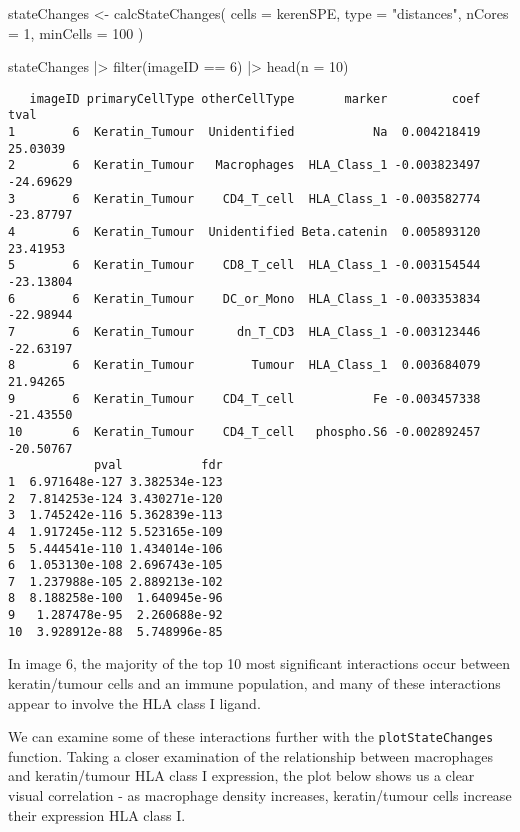 \documentclass[
  letterpaper,
  DIV=11,
  numbers=noendperiod]{scrreprt}
\newenvironment{Shaded}{\begin{snugshade}}{\end{snugshade}}
\newcommand{\AttributeTok}[1]{\textcolor[rgb]{0.40,0.45,0.13}{#1}}
\newcommand{\DecValTok}[1]{\textcolor[rgb]{0.68,0.00,0.00}{#1}}
\newcommand{\FunctionTok}[1]{\textcolor[rgb]{0.28,0.35,0.67}{#1}}
\newcommand{\NormalTok}[1]{\textcolor[rgb]{0.00,0.23,0.31}{#1}}
\newcommand{\OtherTok}[1]{\textcolor[rgb]{0.00,0.23,0.31}{#1}}
\newcommand{\SpecialCharTok}[1]{\textcolor[rgb]{0.37,0.37,0.37}{#1}}
\newcommand{\StringTok}[1]{\textcolor[rgb]{0.13,0.47,0.30}{#1}}
\begin{document}
\begin{Shaded}
\begin{Highlighting}[]
\NormalTok{stateChanges }\OtherTok{\textless{}{-}} \FunctionTok{calcStateChanges}\NormalTok{(}
  \AttributeTok{cells =}\NormalTok{ kerenSPE,}
  \AttributeTok{type =} \StringTok{"distances"}\NormalTok{,}
  \AttributeTok{nCores =} \DecValTok{1}\NormalTok{,}
  \AttributeTok{minCells =} \DecValTok{100}
\NormalTok{)}

\NormalTok{stateChanges }\SpecialCharTok{|\textgreater{}}
  \FunctionTok{filter}\NormalTok{(imageID }\SpecialCharTok{==} \DecValTok{6}\NormalTok{) }\SpecialCharTok{|\textgreater{}}
  \FunctionTok{head}\NormalTok{(}\AttributeTok{n =} \DecValTok{10}\NormalTok{)}
\end{Highlighting}
\end{Shaded}

\begin{verbatim}
   imageID primaryCellType otherCellType       marker         coef      tval
1        6  Keratin_Tumour  Unidentified           Na  0.004218419  25.03039
2        6  Keratin_Tumour   Macrophages  HLA_Class_1 -0.003823497 -24.69629
3        6  Keratin_Tumour    CD4_T_cell  HLA_Class_1 -0.003582774 -23.87797
4        6  Keratin_Tumour  Unidentified Beta.catenin  0.005893120  23.41953
5        6  Keratin_Tumour    CD8_T_cell  HLA_Class_1 -0.003154544 -23.13804
6        6  Keratin_Tumour    DC_or_Mono  HLA_Class_1 -0.003353834 -22.98944
7        6  Keratin_Tumour      dn_T_CD3  HLA_Class_1 -0.003123446 -22.63197
8        6  Keratin_Tumour        Tumour  HLA_Class_1  0.003684079  21.94265
9        6  Keratin_Tumour    CD4_T_cell           Fe -0.003457338 -21.43550
10       6  Keratin_Tumour    CD4_T_cell   phospho.S6 -0.002892457 -20.50767
            pval           fdr
1  6.971648e-127 3.382534e-123
2  7.814253e-124 3.430271e-120
3  1.745242e-116 5.362839e-113
4  1.917245e-112 5.523165e-109
5  5.444541e-110 1.434014e-106
6  1.053130e-108 2.696743e-105
7  1.237988e-105 2.889213e-102
8  8.188258e-100  1.640945e-96
9   1.287478e-95  2.260688e-92
10  3.928912e-88  5.748996e-85
\end{verbatim}

In image 6, the majority of the top 10 most significant interactions
occur between keratin/tumour cells and an immune population, and many of
these interactions appear to involve the HLA class I ligand.

We can examine some of these interactions further with the
\texttt{plotStateChanges} function. Taking a closer examination of the
relationship between macrophages and keratin/tumour HLA class I
expression, the plot below shows us a clear visual correlation - as
macrophage density increases, keratin/tumour cells increase their
expression HLA class I.
\end{document}
